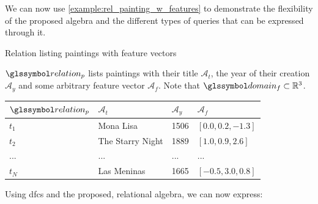 We can now use \cref{example:rel_painting_w_features} to demonstrate the flexibility of the proposed algebra and the different types of queries that can be expressed through it.

\begin{example}[label=example:rel_painting_w_features]{Relation listing paintings with feature vectors}{}
    
    $\relation_{p}$ lists paintings with their title $\mathcal{A}_{t}$, the year of their creation $\mathcal{A}_{y}$ and some arbitrary feature vector $\mathcal{A}_{f}$. Note that $\domain_{f} \subset \mathbb{R}^{3}$.
        
    \begin{center}
        \begin{tabular}{ l || l | l | l |}
            $\relation_{p}$ & $\mathcal{A}_{t}$  & $\mathcal{A}_{y}$  & $\mathcal{A}_{f}$ \\ 
            \hline
            \hline
            $t_1$ & Mona Lisa & 1506 & $\left\lbrack 0.0, 0.2, -1.3 \right\rbrack$ \\
            \hline
            $t_2$ & The Starry Night & 1889 & $\left\lbrack 1.0, 0.9, 2.6 \right\rbrack$ \\
            \hline
            ... & ... & ... & ... \\
            \hline
            $t_N$ & Las Meninas & 1665 & $\left\lbrack -0.5, 3.0, 0.8 \right\rbrack$ \\
            \hline
        \end{tabular}
    \end{center}

    Using \acrshort{dfc}s and the proposed, relational algebra,  we can now express:


\end{example}
